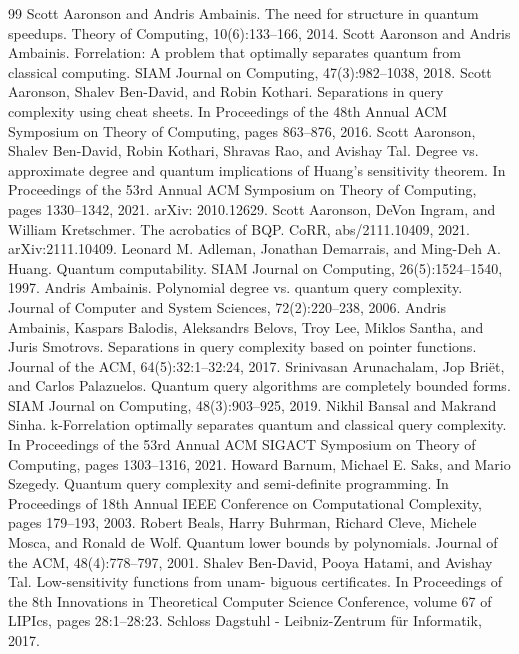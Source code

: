 \documentclass[10pt,a4paper]{article}
\begin{document}
\begin{thebibliography}{99}
 Scott Aaronson and Andris Ambainis. The need for structure in quantum speedups. Theory of Computing, 10(6):133–166, 2014.
 Scott Aaronson and Andris Ambainis. Forrelation: A problem that optimally separates quantum from classical computing. SIAM Journal on Computing, 47(3):982–1038, 2018.
 Scott Aaronson, Shalev Ben-David, and Robin Kothari. Separations in query complexity using cheat sheets. In Proceedings of the 48th Annual ACM Symposium on Theory of Computing, pages 863–876, 2016.
 Scott Aaronson, Shalev Ben-David, Robin Kothari, Shravas Rao, and Avishay Tal. Degree vs. approximate degree and quantum implications of Huang’s sensitivity theorem. In Proceedings of the 53rd Annual ACM Symposium on Theory of Computing, pages 1330–1342, 2021. arXiv: 2010.12629.
 Scott Aaronson, DeVon Ingram, and William Kretschmer. The acrobatics of BQP. CoRR, abs/2111.10409, 2021. arXiv:2111.10409.
 Leonard M. Adleman, Jonathan Demarrais, and Ming-Deh A. Huang. Quantum computability. SIAM Journal on Computing, 26(5):1524–1540, 1997.
 Andris Ambainis. Polynomial degree vs. quantum query complexity. Journal of Computer and System Sciences, 72(2):220–238, 2006.
 Andris Ambainis, Kaspars Balodis, Aleksandrs Belovs, Troy Lee, Miklos Santha, and Juris Smotrovs. Separations in query complexity based on pointer functions. Journal of the ACM, 64(5):32:1–32:24, 2017.
 Srinivasan Arunachalam, Jop Briët, and Carlos Palazuelos. Quantum query algorithms are completely bounded forms. SIAM Journal on Computing, 48(3):903–925, 2019.
 Nikhil Bansal and Makrand Sinha. k-Forrelation optimally separates quantum and classical query complexity. In Proceedings of the 53rd Annual ACM SIGACT Symposium on Theory of Computing, pages 1303–1316, 2021.
 Howard Barnum, Michael E. Saks, and Mario Szegedy. Quantum query complexity and semi-definite programming. In Proceedings of 18th Annual IEEE Conference on Computational Complexity, pages 179–193, 2003.
 Robert Beals, Harry Buhrman, Richard Cleve, Michele Mosca, and Ronald de Wolf. Quantum lower bounds by polynomials. Journal of the ACM, 48(4):778–797, 2001.
 Shalev Ben-David, Pooya Hatami, and Avishay Tal. Low-sensitivity functions from unam- biguous certificates. In Proceedings of the 8th Innovations in Theoretical Computer Science Conference, volume 67 of LIPIcs, pages 28:1–28:23. Schloss Dagstuhl - Leibniz-Zentrum für Informatik, 2017.

\end{thebibliography}
\end{document}
